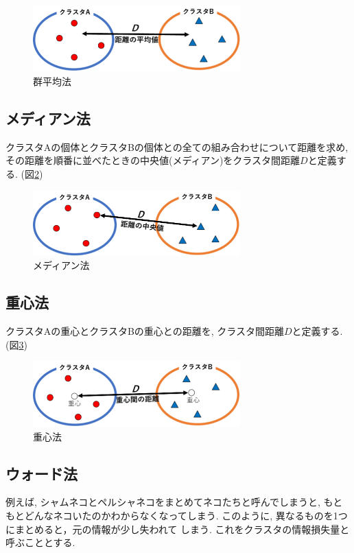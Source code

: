 \documentclass[a4paper,11pt,dvipdfmx]{jsarticle}
\begin{document}
\begin{figure}[htb]
  \centering
  \includegraphics[width=8cm]{../pics/GAM.png}
  \caption{群平均法}
  \label{fig:gam}
\end{figure}

\subsection*{メディアン法}
クラスタAの個体とクラスタBの個体との全ての組み合わせについて距離を求め, 
その距離を順番に並べたときの中央値(メディアン)をクラスタ間距離$D$と定義する. (図\ref{fig:med})

\begin{figure}[htb]
  \centering
  \includegraphics[width=8cm]{../pics/MED.png}
  \caption{メディアン法}
  \label{fig:med}
\end{figure}

\subsection*{重心法}
クラスタAの重心とクラスタBの重心との距離を, クラスタ間距離$D$と定義する. (図\ref{fig:center})

\begin{figure}[htb]
  \centering
  \includegraphics[width=8cm]{../pics/Center.png}
  \caption{重心法}
  \label{fig:center}
\end{figure}

\subsection*{ウォード法}
例えば, シャムネコとペルシャネコをまとめてネコたちと呼んでしまうと, もともとどんなネコいたのかわからなくなってしまう. このように, 異なるものを1つにまとめると，元の情報が少し失われて しまう. これをクラスタの情報損失量と呼ぶこととする.
\end{document}
